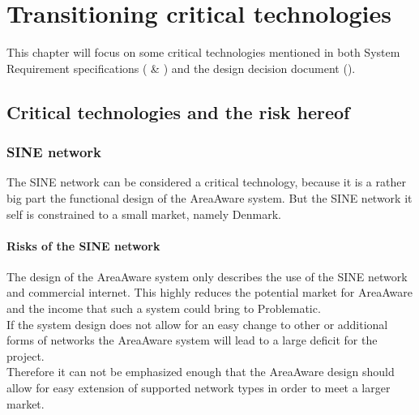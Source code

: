 %
\thispagestyle{fancy}
\chapter{Transitioning critical technologies}
\label{chp:trans_crit_tech}
This chapter will focus on some critical technologies mentioned in both System Requirement specifications (\srshq{} \& \srsdis) and the design decision document (\pdd).

\section{Critical technologies and the risk hereof}
\subsection{SINE network}
The SINE network can be considered a critical technology, because it is a rather big part the functional design of the AreaAware system.
But the SINE network it self is constrained to a small market, namely Denmark.

\subsubsection{Risks of the SINE network}
The design of the AreaAware system only describes the use of the SINE network and commercial internet.
This highly reduces the potential market for AreaAware and the income that such a system could bring to Problematic.\\
If the system design does not allow for an easy change to other or additional forms of networks the AreaAware system will lead to a large deficit for the project.\\
Therefore it can not be emphasized enough that the AreaAware design should allow for easy extension of supported network types in order to meet a larger market.
